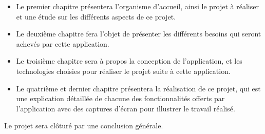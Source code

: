 \begin{small}
    \begin{itemize}
        \item Le premier chapitre présentera l'organisme d'accueil, ainsi le projet à réaliser et une étude sur les différents aspects de ce projet.
        \item Le deuxième chapitre fera l'objet de présenter les différents besoins qui seront achevés par cette application.
        \item Le troisième chapitre sera à propos la conception de l'application, et les technologies choisies pour réaliser le projet suite à cette application.
        \item Le quatrième et dernier chapitre présentera la réalisation de ce projet, qui est une explication détaillée de chacune des fonctionnalités offerts par l'application avec des captures d'écran pour illustrer le travail réalisé.
    \end{itemize}

    \noindent Le projet sera clôturé par une conclusion générale.
\end{small}
